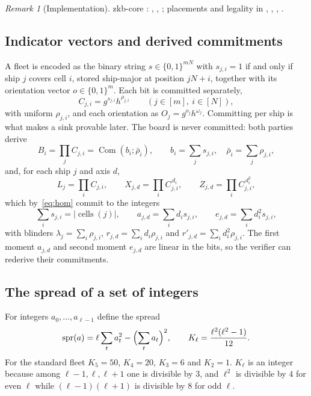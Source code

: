 \documentclass[11pt]{article}
\theoremstyle{definition}
\theoremstyle{remark}
\newtheorem{remark}[lemma]{Remark}
\newcommand{\Com}{\operatorname{Com}}
\newcommand{\cells}{\operatorname{cells}}
\newcommand{\spr}{\operatorname{spr}}
\begin{document}
\begin{remark}[Implementation]\label{rem:impl-encoding}
zkb-core : , , ; placements and legality in , , , .
\end{remark}

\subsection{Indicator vectors and derived commitments}\label{sec:indicators}
A fleet is encoded as the binary string $s\in\{0,1\}^{mN}$ with $s_{j,i}=1$ if and only if ship $j$ covers cell $i$, stored ship-major at position $jN+i$, together with its orientation vector $o\in\{0,1\}^m$. Each bit is committed separately,
\[
  C_{j,i}=g^{s_{j,i}}h^{\rho_{j,i}}\qquad(j\in[m],\ i\in[N]),
\]
with uniform $\rho_{j,i}$, and each orientation as $O_j=g^{o_j}h^{\omega_j}$. Committing per ship is what makes a sink provable later. The board is never committed: both parties derive
\[
  B_i=\prod_jC_{j,i}=\Com(b_i;\bar\rho_i),\qquad b_i=\sum_js_{j,i},\quad\bar\rho_i=\sum_j\rho_{j,i},
\]
and, for each ship $j$ and axis $d$,
\[
  L_j=\prod_iC_{j,i},\qquad X_{j,d}=\prod_iC_{j,i}^{\,d_i},\qquad Z_{j,d}=\prod_iC_{j,i}^{\,d_i^2},
\]
which by~\eqref{eq:hom} commit to the integers
\[
  \textstyle\sum_is_{j,i}=|\cells(j)|,\qquad a_{j,d}=\sum_id_is_{j,i},\qquad e_{j,d}=\sum_id_i^2s_{j,i},
\]
with blinders $\lambda_j=\sum_i\rho_{j,i}$, $r_{j,d}=\sum_id_i\rho_{j,i}$ and $r'_{j,d}=\sum_id_i^2\rho_{j,i}$. The first moment $a_{j,d}$ and second moment $e_{j,d}$ are linear in the bits, so the verifier can rederive their commitments.

\subsection{The spread of a set of integers}\label{sec:spread}
For integers $a_0,\ldots,a_{\ell-1}$ define the spread
\[
  \spr(a)=\ell\sum_ta_t^2-\Bigl(\sum_ta_t\Bigr)^2,\qquad
  K_\ell=\frac{\ell^2(\ell^2-1)}{12}.
\]
For the standard fleet $K_5=50$, $K_4=20$, $K_3=6$ and $K_2=1$. $K_\ell$ is an integer because among $\ell-1,\ell,\ell+1$ one is divisible by $3$, and $\ell^2$ is divisible by $4$ for even $\ell$ while $(\ell-1)(\ell+1)$ is divisible by $8$ for odd $\ell$.
\end{document}
